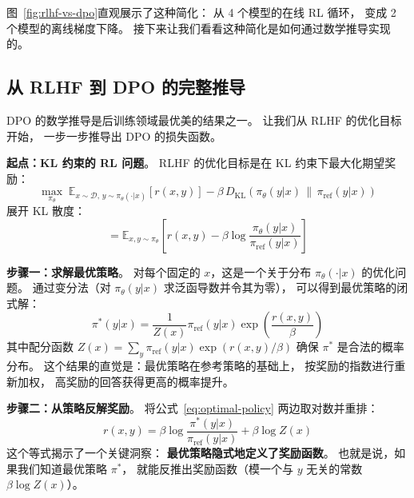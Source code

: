 图~\ref{fig:rlhf-vs-dpo}直观展示了这种简化：
从 4 个模型的在线 RL 循环，
变成 2 个模型的离线梯度下降。
接下来让我们看看这种简化是如何通过数学推导实现的。

\subsection{从 RLHF 到 DPO 的完整推导}

DPO 的数学推导是后训练领域最优美的结果之一。
让我们从 RLHF 的优化目标开始，
一步一步推导出 DPO 的损失函数。

\textbf{起点：KL 约束的 RL 问题}。
RLHF 的优化目标是在 KL 约束下最大化期望奖励：
\begin{equation}
  \max_{\pi_\theta} \; \mathbb{E}_{x \sim \mathcal{D},\, y \sim \pi_\theta(\cdot|x)}
  \!\left[ r(x, y) \right]
  - \beta \, D_{\text{KL}}\!\left(\pi_\theta(y|x) \,\|\, \pi_{\text{ref}}(y|x)\right)
  \label{eq:rlhf-objective}
\end{equation}
展开 KL 散度：
\begin{equation}
  = \mathbb{E}_{x, y \sim \pi_\theta}\!\left[
    r(x,y) - \beta \log \frac{\pi_\theta(y|x)}{\pi_{\text{ref}}(y|x)}
  \right]
\end{equation}

\textbf{步骤一：求解最优策略}。
对每个固定的 $x$，这是一个关于分布 $\pi_\theta(\cdot|x)$ 的优化问题。
通过变分法（对 $\pi_\theta(y|x)$ 求泛函导数并令其为零），
可以得到最优策略的闭式解：
\begin{equation}
  \pi^*(y|x) = \frac{1}{Z(x)} \pi_{\text{ref}}(y|x) \exp\!\left(\frac{r(x,y)}{\beta}\right)
  \label{eq:optimal-policy}
\end{equation}
其中配分函数 $Z(x) = \sum_y \pi_{\text{ref}}(y|x) \exp(r(x,y)/\beta)$
确保 $\pi^*$ 是合法的概率分布。
这个结果的直觉是：最优策略在参考策略的基础上，
按奖励的指数进行重新加权，
高奖励的回答获得更高的概率提升。

\textbf{步骤二：从策略反解奖励}。
将公式~\eqref{eq:optimal-policy} 两边取对数并重排：
\begin{equation}
  r(x,y) = \beta \log \frac{\pi^*(y|x)}{\pi_{\text{ref}}(y|x)} + \beta \log Z(x)
  \label{eq:reward-from-policy}
\end{equation}
这个等式揭示了一个关键洞察：
\textbf{最优策略隐式地定义了奖励函数}。
也就是说，如果我们知道最优策略 $\pi^*$，
就能反推出奖励函数（模一个与 $y$ 无关的常数 $\beta \log Z(x)$）。

